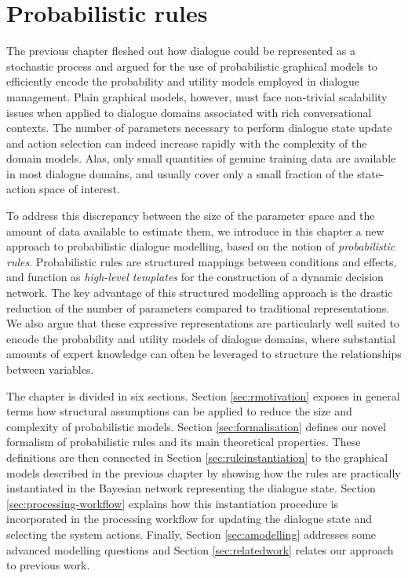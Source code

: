 \chapter{Probabilistic rules}
\label{chap:rules}

The previous chapter fleshed out how dialogue could be represented as a stochastic process and argued for the use of probabilistic graphical models to efficiently encode the probability and utility models employed in dialogue management. Plain graphical models, however, must face non-trivial scalability issues when applied to dialogue domains associated with rich conversational contexts. The number of parameters necessary to perform dialogue state update and action selection can indeed increase rapidly with the complexity of the domain models. Alas, only small quantities of genuine training data are available in most dialogue domains, and usually cover only a small fraction of the state-action space of interest. 

To address this discrepancy between the size of the parameter space and the amount of data available to estimate them, we introduce in this chapter a new approach to probabilistic dialogue modelling, based on the notion of \textit{probabilistic rules}.  Probabilistic rules are structured mappings between conditions and effects, and function as \textit{high-level templates} for the construction of a dynamic decision network.  The key advantage of this structured modelling approach is the drastic reduction of the number of parameters compared to traditional representations.  We also argue that these expressive representations are particularly well suited to encode the probability and utility models of dialogue domains, where substantial amounts of expert knowledge can often be leveraged to structure the relationships between variables. 

The chapter is divided in six sections. Section \ref{sec:rmotivation} exposes in general terms how structural assumptions can be applied to reduce the size and complexity of probabilistic models.  Section \ref{sec:formalisation} defines our novel formalism of probabilistic rules and its main theoretical properties.  These definitions are then connected in Section \ref{sec:ruleinstantiation} to the graphical models described in the previous chapter by showing how the rules are practically instantiated in the Bayesian network representing the dialogue state. Section \ref{sec:processing-workflow} explains how this instantiation procedure is incorporated in the processing workflow for updating the dialogue state and selecting the system actions. Finally, Section \ref{sec:amodelling} addresses some advanced modelling questions and Section \ref{sec:relatedwork} relates our approach to previous work.


